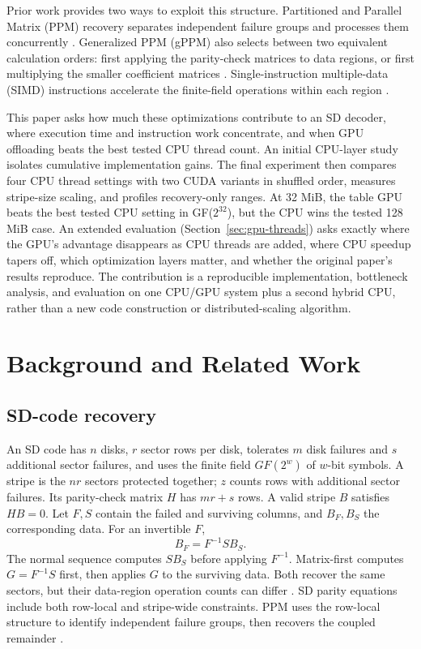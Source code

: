 \documentclass[conference]{IEEEtran}
\begin{document}
Prior work provides two ways to exploit this structure. Partitioned and Parallel Matrix (PPM) recovery separates independent failure groups and processes them concurrently \cite{li2015ppm}. Generalized PPM (gPPM) also selects between two equivalent calculation orders: first applying the parity-check matrices to data regions, or first multiplying the smaller coefficient matrices \cite{li2023gppm}. Single-instruction multiple-data (SIMD) instructions accelerate the finite-field operations within each region \cite{plank2013simd}.

This paper asks how much these optimizations contribute to an SD decoder, where execution time and instruction work concentrate, and when GPU offloading beats the best tested CPU thread count. An initial CPU-layer study isolates cumulative implementation gains. The final experiment then compares four CPU thread settings with two CUDA variants in shuffled order, measures stripe-size scaling, and profiles recovery-only ranges. At 32 MiB, the table GPU beats the best tested CPU setting in GF($2^{32}$), but the CPU wins the tested 128 MiB case. An extended evaluation (Section~\ref{sec:gpu-threads}) asks exactly where the GPU's advantage disappears as CPU threads are added, where CPU speedup tapers off, which optimization layers matter, and whether the original paper's results reproduce. The contribution is a reproducible implementation, bottleneck analysis, and evaluation on one CPU/GPU system plus a second hybrid CPU, rather than a new code construction or distributed-scaling algorithm.

\section{Background and Related Work}
\subsection{SD-code recovery}
An SD code has $n$ disks, $r$ sector rows per disk, tolerates $m$ disk failures and $s$ additional sector failures, and uses the finite field $GF(2^w)$ of $w$-bit symbols. A stripe is the $nr$ sectors protected together; $z$ counts rows with additional sector failures. Its parity-check matrix $H$ has $mr+s$ rows. A valid stripe $B$ satisfies $HB=0$. Let $F,S$ contain the failed and surviving columns, and $B_F,B_S$ the corresponding data. For an invertible $F$,
\begin{equation}
B_F = F^{-1} S B_S.
\label{eq:recover}
\end{equation}
The normal sequence computes $S B_S$ before applying $F^{-1}$. Matrix-first computes $G=F^{-1}S$ first, then applies $G$ to the surviving data. Both recover the same sectors, but their data-region operation counts can differ \cite{li2023gppm}. SD parity equations include both row-local and stripe-wide constraints. PPM uses the row-local structure to identify independent failure groups, then recovers the coupled remainder \cite{li2015ppm}.
\end{document}
